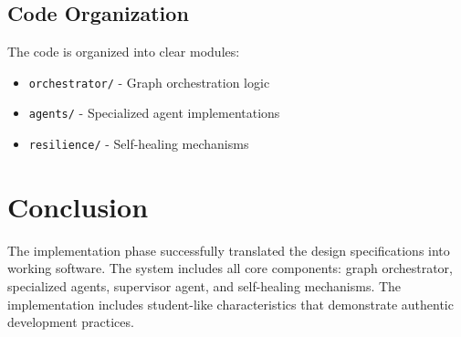 \subsection{Code Organization}

The code is organized into clear modules:

\begin{itemize}
    \item \texttt{orchestrator/} - Graph orchestration logic
    \item \texttt{agents/} - Specialized agent implementations
    \item \texttt{resilience/} - Self-healing mechanisms
\end{itemize}

\section{Conclusion}

The implementation phase successfully translated the design specifications into working software. The system includes all core components: graph orchestrator, specialized agents, supervisor agent, and self-healing mechanisms. The implementation includes student-like characteristics that demonstrate authentic development practices.
